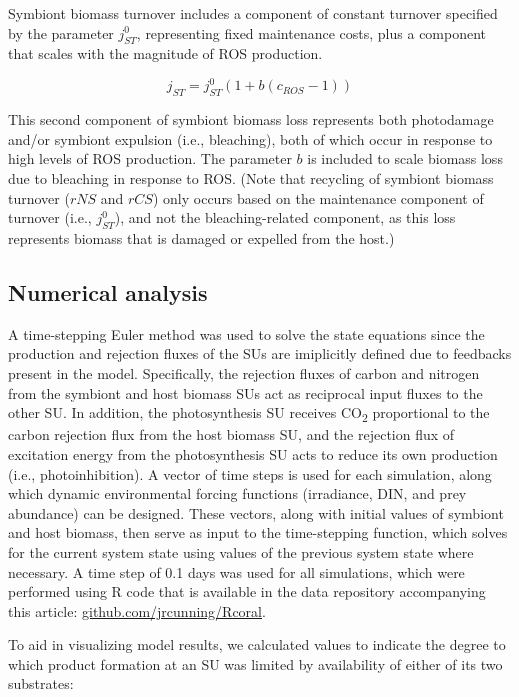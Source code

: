 \documentclass[]{elsarticle} %
\begin{document}
Symbiont biomass turnover includes a component of constant turnover
specified by the parameter \(j_{ST}^0\), representing fixed maintenance
costs, plus a component that scales with the magnitude of ROS
production.

\begin{equation} j_{ST} = j_{ST}^0(1 + b(c_{ROS}-1)) \end{equation}

This second component of symbiont biomass loss represents both
photodamage and/or symbiont expulsion (i.e., bleaching), both of which
occur in response to high levels of ROS production. The parameter \(b\)
is included to scale biomass loss due to bleaching in response to ROS.
(Note that recycling of symbiont biomass turnover (\(rNS\) and \(rCS\))
only occurs based on the maintenance component of turnover (i.e.,
\(j_{ST}^0\)), and not the bleaching-related component, as this loss
represents biomass that is damaged or expelled from the host.)

\subsection{Numerical analysis}\label{numerical-analysis}

A time-stepping Euler method was used to solve the state equations since
the production and rejection fluxes of the SUs are imiplicitly defined
due to feedbacks present in the model. Specifically, the rejection
fluxes of carbon and nitrogen from the symbiont and host biomass SUs act
as reciprocal input fluxes to the other SU. In addition, the
photosynthesis SU receives CO\textsubscript{2} proportional to the
carbon rejection flux from the host biomass SU, and the rejection flux
of excitation energy from the photosynthesis SU acts to reduce its own
production (i.e., photoinhibition). A vector of time steps is used for
each simulation, along which dynamic environmental forcing functions
(irradiance, DIN, and prey abundance) can be designed. These vectors,
along with initial values of symbiont and host biomass, then serve as
input to the time-stepping function, which solves for the current system
state using values of the previous system state where necessary. A time
step of 0.1 days was used for all simulations, which were performed
using R code that is available in the data repository accompanying this
article: \url{github.com/jrcunning/Rcoral}.

To aid in visualizing model results, we calculated values to indicate
the degree to which product formation at an SU was limited by
availability of either of its two substrates:
\end{document}
